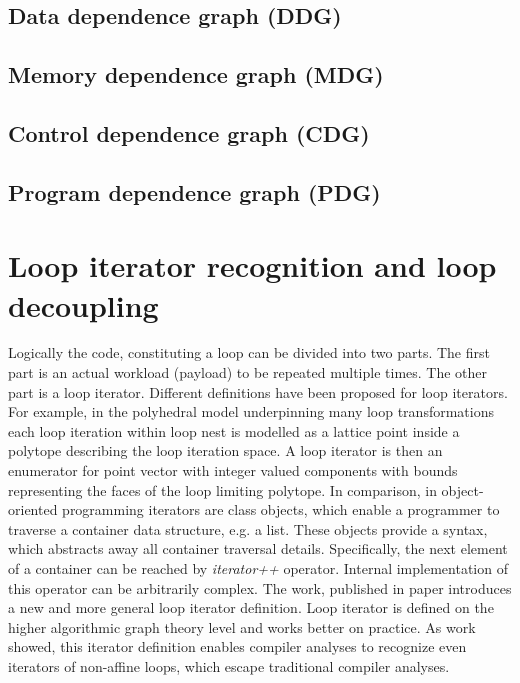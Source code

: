 \subsection{Data dependence graph (DDG)} \label{background-ddg}
\subsection{Memory dependence graph (MDG)} \label{background-mdg}
\subsection{Control dependence graph (CDG)} \label{background-cdg}
\subsection{Program dependence graph (PDG)} \label{background-pdg}

\section{Loop iterator recognition and loop decoupling} \label{background-loop-decoupling}
\qquad Logically the code, constituting a loop can be divided into two parts. The first part is an actual workload (payload) to be repeated multiple times. The other part is a loop iterator.\newline
\null\qquad Different definitions have been proposed for loop iterators. For example, in the polyhedral model underpinning many loop transformations each loop iteration within loop nest is modelled as a lattice point inside a polytope describing the loop iteration space. A loop iterator is then an enumerator for point vector with integer valued components with bounds representing the faces of the loop limiting polytope.\newline
\null\qquad In comparison, in object-oriented programming iterators are class objects, which enable a programmer to traverse a container data structure, e.g. a list. These objects provide a syntax, which abstracts away all container traversal details. Specifically, the next element of a container can be reached by \textit{iterator++} operator. Internal implementation of this operator can be arbitrarily complex.\newline
\null\qquad The work, published in paper \cite{iterator-recognition-paper} introduces a new and more general loop iterator definition. Loop iterator is defined on the higher algorithmic graph theory level and works better on practice. As work \cite{iterator-recognition-paper} showed, this iterator definition enables compiler analyses to recognize even iterators of non-affine loops, which escape traditional compiler analyses.

